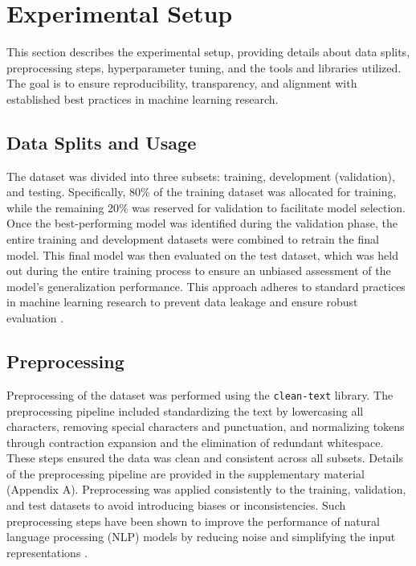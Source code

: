 \section{Experimental Setup}

This section describes the experimental setup, providing details about data splits, preprocessing steps, hyperparameter tuning, and the tools and libraries utilized. The goal is to ensure reproducibility, transparency, and alignment with established best practices in machine learning research.

\subsection{Data Splits and Usage}

The dataset was divided into three subsets: training, development (validation), and testing. Specifically, 80\% of the training dataset was allocated for training, while the remaining 20\% was reserved for validation to facilitate model selection. Once the best-performing model was identified during the validation phase, the entire training and development datasets were combined to retrain the final model. This final model was then evaluated on the test dataset, which was held out during the entire training process to ensure an unbiased assessment of the model's generalization performance. This approach adheres to standard practices in machine learning research to prevent data leakage and ensure robust evaluation \citep{Goodfellow-et-al-2016}.

\subsection{Preprocessing}

Preprocessing of the dataset was performed using the \texttt{clean-text} library. The preprocessing pipeline included standardizing the text by lowercasing all characters, removing special characters and punctuation, and normalizing tokens through contraction expansion and the elimination of redundant whitespace. These steps ensured the data was clean and consistent across all subsets. Details of the preprocessing pipeline are provided in the supplementary material (Appendix A). Preprocessing was applied consistently to the training, validation, and test datasets to avoid introducing biases or inconsistencies. Such preprocessing steps have been shown to improve the performance of natural language processing (NLP) models by reducing noise and simplifying the input representations \citep{Zhang2020DataPrep}.


